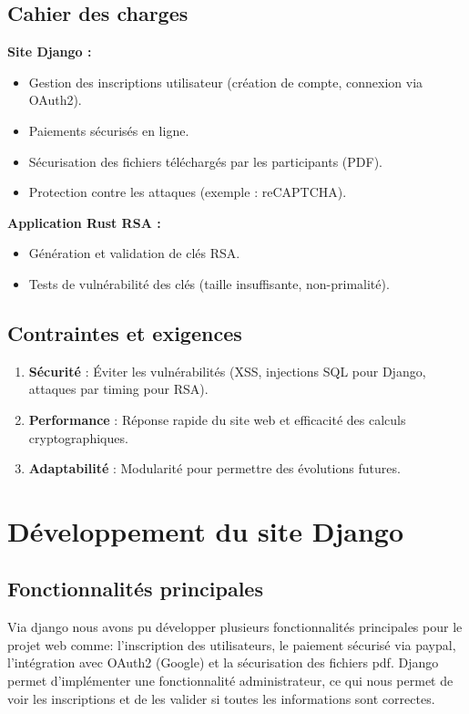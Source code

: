 \documentclass[12pt]{article} %
\begin{document}
	\subsection{Cahier des charges}
		\textbf{Site Django :}
        \begin{itemize}
            \item Gestion des inscriptions utilisateur (création de compte, connexion via OAuth2).
            \item Paiements sécurisés en ligne.
            \item Sécurisation des fichiers téléchargés par les participants (PDF).
            \item Protection contre les attaques (exemple : reCAPTCHA).
        \end{itemize}
        \textbf{Application Rust RSA :} 
        \begin{itemize}
            \item Génération et validation de clés RSA.
            \item Tests de vulnérabilité des clés (taille insuffisante, non-primalité).
        \end{itemize}

	\subsection{Contraintes et exigences}
		\begin{enumerate}
		    \item \textbf{Sécurité} : Éviter les vulnérabilités (XSS, injections SQL pour Django, attaques par timing pour RSA).
            \item \textbf{Performance} : Réponse rapide du site web et efficacité des calculs cryptographiques.
            \item \textbf{Adaptabilité} : Modularité pour permettre des évolutions futures.

		\end{enumerate}


\section{Développement du site Django}
	\subsection{Fonctionnalités principales}
        Via django nous avons pu développer plusieurs fonctionnalités principales pour le projet web comme: l'inscription des utilisateurs, le paiement sécurisé via paypal, l'intégration avec OAuth2 (Google) et la sécurisation des fichiers pdf. Django permet d'implémenter une fonctionnalité administrateur, ce qui nous permet de voir les inscriptions et de les valider si toutes les informations sont correctes.
\end{document}
